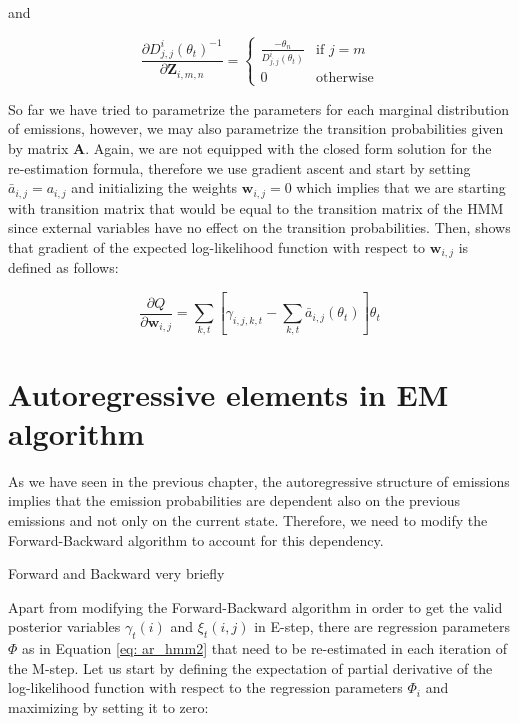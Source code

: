 and 

\begin{equation}
    \frac{\partial D_{j,j}^i(\theta_t)^{-1}}{\partial \textbf{Z}_{i,m,n}} =
    \begin{cases} 
        \frac{-\theta_n}{D_{j,j}^i(\theta_t)} & \text{if } j = m \\
        0 & \text{otherwise}
    \end{cases}
\end{equation}

So far we have tried to parametrize the parameters for each marginal distribution of emissions, however, we may also parametrize the transition probabilities
given by matrix $\textbf{A}$. Again, we are not equipped with the closed form solution for the re-estimation formula, therefore we use gradient ascent and start by setting $\bar{a}_{i,j} = a_{i,j}$
and initializing the weights $\textbf{w}_{i,j}=0$ which implies that we are starting with transition matrix that would be equal to the transition matrix of the HMM since 
external variables have no effect on the transition probabilities. Then, \citep{Radenen2014} shows that gradient of the expected log-likelihood function with respect to
$\textbf{w}_{i,j}$ is defined as follows:

\begin{equation}
    \frac{\partial Q}{\partial \textbf{w}_{i,j}} = \sum_{k,t} \left[\gamma_{i,j,k,t} - \sum_{k,t} \bar{a}_{i,j}(\theta_t) \right] \theta_t
\end{equation}

\section{Autoregressive elements in EM algorithm}

As we have seen in the previous chapter, the autoregressive structure of emissions implies that the emission probabilities are dependent also on the previous emissions and not only 
on the current state. Therefore, we need to modify the Forward-Backward algorithm to account for this dependency. \citep{Xuan2004}

Forward and Backward very briefly

Apart from modifying the Forward-Backward algorithm in order to get the valid posterior variables $\gamma_t(i)$ and $\xi_t(i,j)$ in E-step, there are 
regression parameters $\Phi$ as in Equation \ref{eq: ar_hmm2} that need to be re-estimated in each iteration of the M-step. Let us start by defining the 
expectation of partial derivative of the log-likelihood function with respect to the regression parameters $\Phi_{i}$ and maximizing by setting it to zero:


